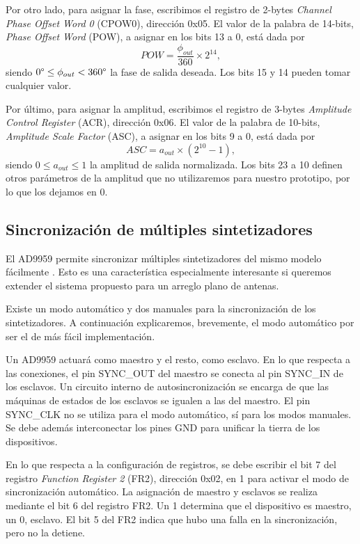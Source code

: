 \documentclass{article}
\newenvironment{standalone}{\begin{preview}}{\end{preview}}
\begin{document}
\begin{standalone}
  Por otro lado, para asignar la fase, escribimos el registro de 2-bytes \textit{Channel Phase Offset Word 0} (CPOW0), dirección 0x05.
  El valor de la palabra de 14-bits, \textit{Phase Offset Word} (POW), a asignar en los bits 13 a 0, está dada por
  \begin{equation}
    POW = \frac{\phi_{out}}{360} \times 2^{14},
  \end{equation}
  siendo $0\degree \leq \phi_{out} < 360\degree$ la fase de salida deseada.
  Los bits 15 y 14 pueden tomar cualquier valor.

  Por último, para asignar la amplitud, escribimos el registro de 3-bytes \textit{Amplitude Control Register} (ACR), dirección 0x06.
  El valor de la palabra de 10-bits, \textit{Amplitude Scale Factor} (ASC), a asignar en los bits 9 a 0, está dada por
  \begin{equation}
    ASC = a_{out} \times \left( 2^{10} - 1 \right),
  \end{equation}
  siendo $0 \leq a_{out} \leq 1$ la amplitud de salida normalizada.
  Los bits 23 a 10 definen otros parámetros de la amplitud que no utilizaremos para nuestro prototipo, por lo que los dejamos en 0.

  \subsection{Sincronización de múltiples sintetizadores} \label{subsec:sincronizacion}

  El AD9959 permite sincronizar múltiples sintetizadores del mismo modelo fácilmente \cite[29,30]{ad9959_datasheet}.
  Esto es una característica especialmente interesante si queremos extender el sistema propuesto para un arreglo plano de antenas.

  Existe un modo automático y dos manuales para la sincronización de los sintetizadores.
  A continuación explicaremos, brevemente, el modo automático por ser el de más fácil implementación.

  Un AD9959 actuará como maestro y el resto, como esclavo.
  En lo que respecta a las conexiones, el pin SYNC\_OUT del maestro se conecta al pin SYNC\_IN de los esclavos.
  Un circuito interno de autosincronización se encarga de que las máquinas de estados de los esclavos se igualen a las del maestro.
  El pin SYNC\_CLK no se utiliza para el modo automático, sí para los modos manuales.
  Se debe además interconectar los pines GND para unificar la tierra de los dispositivos.

  En lo que respecta a la configuración de registros, se debe escribir el bit 7 del registro \textit{Function Register 2} (FR2), dirección 0x02, en 1 para activar el modo de sincronización automático.
  La asignación de maestro y esclavos se realiza mediante el bit 6 del registro FR2.
  Un 1 determina que el dispositivo es maestro, un 0, esclavo.
  El bit 5 del FR2 indica que hubo una falla en la sincronización, pero no la detiene.


\end{standalone}
\end{document}
